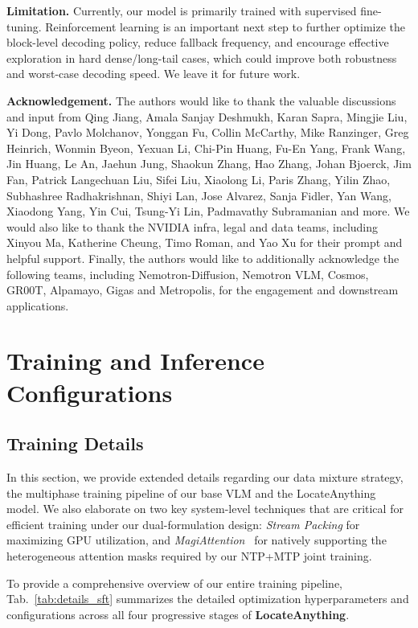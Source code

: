 \documentclass{llmxive}
\begin{document}
\noindent\textbf{Limitation.} Currently, our model is primarily trained with supervised fine-tuning. Reinforcement learning is an important next step to further optimize the block-level decoding policy, reduce fallback frequency, and encourage effective exploration in hard dense/long-tail cases, which could improve both robustness and worst-case decoding speed. We leave it for future work.

\noindent\textbf{Acknowledgement.} The authors would like to thank the valuable discussions and input from Qing Jiang, Amala Sanjay Deshmukh, Karan Sapra, Mingjie Liu, Yi Dong, Pavlo Molchanov, Yonggan Fu, Collin McCarthy, Mike Ranzinger, Greg Heinrich, Wonmin Byeon, Yexuan Li, Chi-Pin Huang, Fu-En Yang, Frank Wang, Jin Huang, Le An, Jaehun Jung, Shaokun Zhang, Hao Zhang, Johan Bjoerck, Jim Fan, Patrick Langechuan Liu, Sifei Liu, Xiaolong Li, Paris Zhang, Yilin Zhao, Subhashree Radhakrishnan, Shiyi Lan, Jose Alvarez, Sanja Fidler, Yan Wang, Xiaodong Yang, Yin Cui, Tsung-Yi Lin, Padmavathy Subramanian and more. We would also like to thank the NVIDIA infra, legal and data teams, including Xinyou Ma, Katherine Cheung, Timo Roman, and Yao Xu for their prompt and helpful support. Finally, the authors would like to additionally acknowledge the following teams, including Nemotron-Diffusion, Nemotron VLM, Cosmos, GR00T, Alpamayo, Gigas and Metropolis, for the engagement and downstream applications.



\appendix

\section{Training and Inference Configurations}

\subsection{Training Details}

In this section, we provide extended details regarding our data mixture strategy, the multiphase training pipeline of our base VLM and the LocateAnything model. We also elaborate on two key system-level techniques that are critical for efficient training under our dual-formulation design: \textit{Stream Packing} for maximizing GPU utilization, and \textit{MagiAttention}~\citep{magiattention2025} for natively supporting the heterogeneous attention masks required by our NTP+MTP joint training.

To provide a comprehensive overview of our entire training pipeline, Tab.~\ref{tab:details_sft} summarizes the detailed optimization hyperparameters and configurations across all four progressive stages of \textbf{LocateAnything}.
\end{document}
